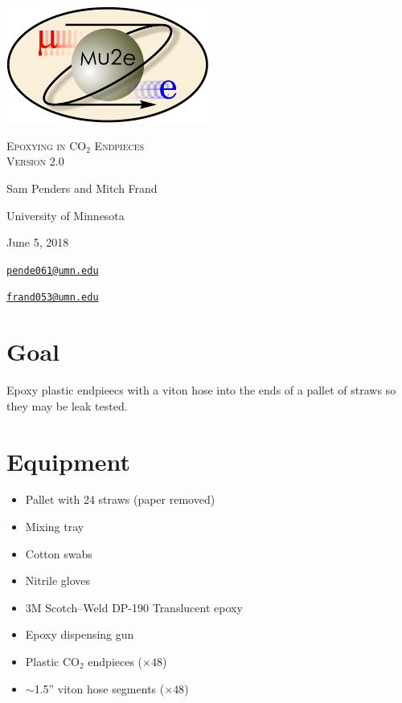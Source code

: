 \documentclass[letterpaper,12pt]{article}
\begin{document}
\begin{titlepage}
	\centering
	\includegraphics[width=0.5\textwidth]{mu2e_logo_oval.png}\par\vspace{2cm}
	{\scshape\LARGE Epoxying in CO$_2$ Endpieces\\ Version 2.0\par}
	\vspace{3cm}
	{\Large Sam Penders and Mitch Frand \par}
	\vspace{3cm}
	{\large University of Minnesota\par}
 	\vspace{.5cm}
	{\large June 5, 2018\par}
	\vfill

{\href{mailto:pende061@physics.umn.edu}
    {\tt{pende061@umn.edu}}\par} 
{\href{mailto:frand053@umn.edu}
    {\tt{frand053@umn.edu}}\par} 
\end{titlepage}

\clearpage
\setcounter{page}{2}


\section{Goal}
Epoxy plastic endpieecs with a viton hose into the ends of a pallet of straws so they may be leak tested.


\section{Equipment}
\begin{multicols}{2}
\begin{itemize}
	\item Pallet with 24 straws (paper removed)
	\item Mixing tray
	\item Cotton swabs
	\item Nitrile gloves
	\item 3M Scotch--Weld DP-190 Translucent epoxy
	\item Epoxy dispensing gun
	\item Plastic CO$_2$ endpieces ($\times 48$)
	\item $\sim$1.5'' viton hose segments ($\times 48$)
\end{itemize}
\end{multicols}
\end{document}
